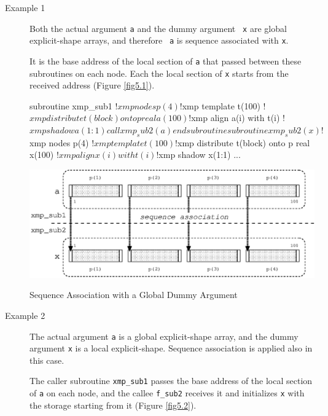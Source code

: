 \begin{description}

\item[Example 1]

	   Both the actual argument {\tt a} and the dummy argument {\tt
	   x} are global explicit-shape arrays, and therefore {\tt
	   a} is sequence associated with {\tt x}.

	   It is the base address of the local section of {\tt a} that
	   passed between these subroutines on each node. Each the local
	   section of {\tt x} starts from the received address (Figure
	   \ref{fig5.1}).

\begin{XFexample}
      subroutine xmp_sub1
!$xmp nodes p(4)
!$xmp template t(100)
!$xmp distribute t(block) onto p
      real a(100)
!$xmp align a(i) with t(i)
!$xmp shadow a(1:1) 
      call xmp_sub2(a)
      end subroutine

      subroutine xmp_sub2(x)
!$xmp nodes p(4)
!$xmp template t(100)
!$xmp distribute t(block) onto p
      real x(100)
!$xmp align x(i) with t(i)
!$xmp shadow x(1:1) 
      ...
\end{XFexample}

\begin{myfigure}
 \includegraphics[scale=0.7]{figs/fig5.1.eps}
 \caption{Sequence Association with a Global Dummy Argument}
 \label{fig5.1}
\end{myfigure}

\item[Example 2]

	   The actual argument {\tt a} is a global explicit-shape array,
	   and the dummy argument {\tt x} is a local explicit-shape. 
	   Sequence association is applied also in this case.

	   The caller subroutine {\tt xmp\_sub1} passes the base address
	   of the local section of {\tt a} on each node, and the callee
	   {\tt f\_sub2} receives it and initializes {\tt x} with the
	   storage starting from it (Figure \ref{fig5.2}).


\end{description}
